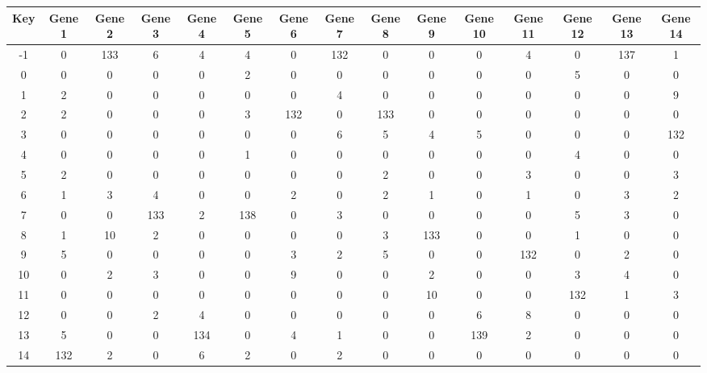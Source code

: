 \begin{tabular}{|c|c|c|c|c|c|c|c|c|c|c|c|c|c|c|}
\hline
Key & Gene 1 & Gene 2 & Gene 3 & Gene 4 & Gene 5 & Gene 6 & Gene 7 & Gene 8 & Gene 9 & Gene 10 & Gene 11 & Gene 12 & Gene 13 & Gene 14 \\
\hline
-1 & 0 & 133 & 6 & 4 & 4 & 0 & 132 & 0 & 0 & 0 & 4 & 0 & 137 & 1 \\
0 & 0 & 0 & 0 & 0 & 2 & 0 & 0 & 0 & 0 & 0 & 0 & 5 & 0 & 0 \\
1 & 2 & 0 & 0 & 0 & 0 & 0 & 4 & 0 & 0 & 0 & 0 & 0 & 0 & 9 \\
2 & 2 & 0 & 0 & 0 & 3 & 132 & 0 & 133 & 0 & 0 & 0 & 0 & 0 & 0 \\
3 & 0 & 0 & 0 & 0 & 0 & 0 & 6 & 5 & 4 & 5 & 0 & 0 & 0 & 132 \\
4 & 0 & 0 & 0 & 0 & 1 & 0 & 0 & 0 & 0 & 0 & 0 & 4 & 0 & 0 \\
5 & 2 & 0 & 0 & 0 & 0 & 0 & 0 & 2 & 0 & 0 & 3 & 0 & 0 & 3 \\
6 & 1 & 3 & 4 & 0 & 0 & 2 & 0 & 2 & 1 & 0 & 1 & 0 & 3 & 2 \\
7 & 0 & 0 & 133 & 2 & 138 & 0 & 3 & 0 & 0 & 0 & 0 & 5 & 3 & 0 \\
8 & 1 & 10 & 2 & 0 & 0 & 0 & 0 & 3 & 133 & 0 & 0 & 1 & 0 & 0 \\
9 & 5 & 0 & 0 & 0 & 0 & 3 & 2 & 5 & 0 & 0 & 132 & 0 & 2 & 0 \\
10 & 0 & 2 & 3 & 0 & 0 & 9 & 0 & 0 & 2 & 0 & 0 & 3 & 4 & 0 \\
11 & 0 & 0 & 0 & 0 & 0 & 0 & 0 & 0 & 10 & 0 & 0 & 132 & 1 & 3 \\
12 & 0 & 0 & 2 & 4 & 0 & 0 & 0 & 0 & 0 & 6 & 8 & 0 & 0 & 0 \\
13 & 5 & 0 & 0 & 134 & 0 & 4 & 1 & 0 & 0 & 139 & 2 & 0 & 0 & 0 \\
14 & 132 & 2 & 0 & 6 & 2 & 0 & 2 & 0 & 0 & 0 & 0 & 0 & 0 & 0 \\
\hline
\end{tabular}